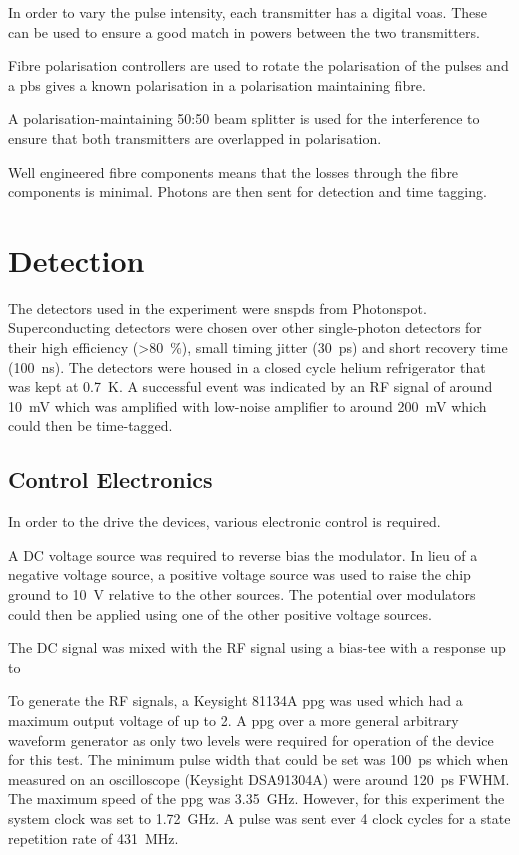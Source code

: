 In order to vary the pulse intensity, each transmitter has a digital \acp{voa}. These can be used to ensure a good match in powers between the two transmitters.

Fibre polarisation controllers are used to rotate the polarisation of the pulses and a \ac{pbs} gives a known polarisation in a polarisation maintaining fibre. 

A polarisation-maintaining {50:50} beam splitter is used for the interference to ensure that both transmitters are overlapped in polarisation.

Well engineered fibre components means that the losses through the fibre components is minimal. Photons are then sent for detection and time tagging.

\section{Detection}

The detectors used in the experiment were \acp{snspd} from Photonspot. Superconducting detectors were chosen over other single-photon detectors for their high efficiency (\SI{>80}{\percent}), small timing jitter (\SI{30}{\ps}) and short recovery time (\SI{100}{\ns}). The detectors were housed in a closed cycle helium refrigerator that was kept at \SI{0.7}{K}. A successful event was indicated by an RF signal of around \SI{10}{\mV} which was amplified with low-noise amplifier to around \SI{200}{\mV} which could then be time-tagged.

\subsection{Control Electronics}

In order to the drive the devices, various electronic control is required. 

A DC voltage source was required to reverse bias the modulator. In lieu of a negative voltage source, a positive voltage source was used to raise the chip ground to \SI{10}{\V} relative to the other sources. The potential over modulators could then be applied using one of the other positive voltage sources.

The DC signal was mixed with the RF signal using a bias-tee with a response up to 

To generate the RF signals, a Keysight 81134A \ac{ppg} was used which had a maximum output voltage of up to \SI{2}{\Vpp}. A \ac{ppg} over a more general arbitrary waveform generator as only two levels were required for operation of the device for this test. The minimum pulse width that could be set was \SI{100}{\ps} which when measured on an oscilloscope (Keysight DSA91304A) were around \SI{120}{\ps} \ac{FWHM}. The maximum speed of the \ac{ppg} was \SI{3.35}{\GHz}. However, for this experiment the system clock was set to \SI{1.72}{\GHz}. A pulse was sent ever 4 clock cycles for a state repetition rate of \SI{431}{\MHz}.

